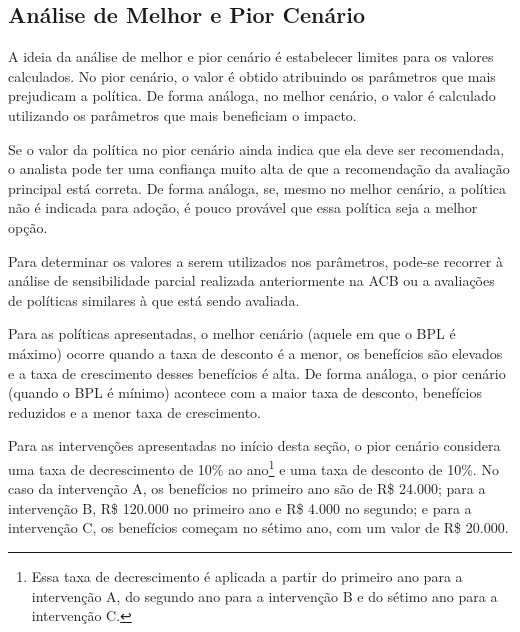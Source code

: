 \documentclass[12pt,letterpaper]{article}
\newcommand{\1}{\mathbbm{1}}
\numberwithin{equation}{section}
\begin{document}




\subsection{Análise de Melhor e Pior Cenário}

A ideia da análise de melhor e pior cenário é estabelecer limites para os valores calculados. No pior cenário, o valor é obtido atribuindo os parâmetros que mais prejudicam a política. De forma análoga, no melhor cenário, o valor é calculado utilizando os parâmetros que mais beneficiam o impacto.

Se o valor da política no pior cenário ainda indica que ela deve ser recomendada, o analista pode ter uma confiança muito alta de que a recomendação da avaliação principal está correta. De forma análoga, se, mesmo no melhor cenário, a política não é indicada para adoção, é pouco provável que essa política seja a melhor opção.

Para determinar os valores a serem utilizados nos parâmetros, pode-se recorrer à análise de sensibilidade parcial realizada anteriormente na ACB ou a avaliações de políticas similares à que está sendo avaliada.

Para as políticas apresentadas, o melhor cenário (aquele em que o BPL é máximo) ocorre quando a taxa de desconto é a menor, os benefícios são elevados e a taxa de crescimento desses benefícios é alta. De forma análoga, o pior cenário (quando o BPL é mínimo) acontece com a maior taxa de desconto, benefícios reduzidos e a menor taxa de crescimento.

Para as intervenções apresentadas no início desta seção, o pior cenário considera uma taxa de decrescimento de 10\% ao ano\footnote{Essa taxa de decrescimento é aplicada a partir do primeiro ano para a intervenção A, do segundo ano para a intervenção B e do sétimo ano para a intervenção C.} e uma taxa de desconto de 10\%. No caso da intervenção A, os benefícios no primeiro ano são de R\$ 24.000; para a intervenção B, R\$ 120.000 no primeiro ano e R\$ 4.000 no segundo; e para a intervenção C, os benefícios começam no sétimo ano, com um valor de R\$ 20.000.
\end{document}

